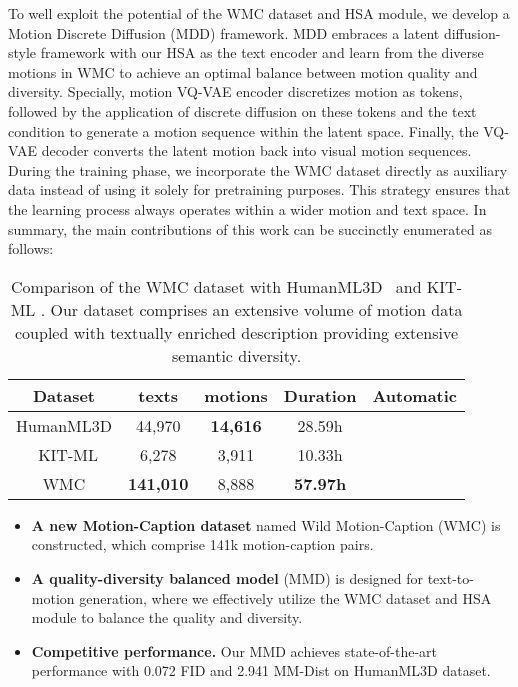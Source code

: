 \documentclass[letterpaper]{article} \usepackage{aaai24}
\newcommand{\xmark}{\ding{55}}
\begin{document}
To well exploit the potential of the WMC dataset and HSA module, we develop a Motion Discrete Diffusion (MDD) framework. MDD embraces a latent diffusion-style framework with our HSA as the text encoder and learn from the diverse motions in WMC to achieve an optimal balance between motion quality and diversity. Specially, 
motion VQ-VAE encoder discretizes motion as tokens, followed by the application of discrete diffusion on these tokens and the text condition to generate a motion sequence within the latent space. Finally, the VQ-VAE decoder converts the latent motion back into visual motion sequences. During the training phase, we incorporate the WMC dataset directly as auxiliary data instead of using it solely for pretraining purposes. This strategy ensures that the learning process always operates within a wider motion and text space. In summary, the main contributions of this work can be succinctly enumerated as follows:
\begin{table}[t]
\small
\begin{tabular}{c|c|c|c|c}
\toprule
Dataset   & texts    & motions & Duration & Automatic \\ \midrule
HumanML3D & 44,970   & \textbf{14,616}  & 28.59h   & \xmark             \\ \ 
KIT-ML    & 6,278   & 3,911   & 10.33h   &  \xmark             \\ \midrule
WMC       & \textbf{141,010} & 8,888   & \textbf{57.97h}   &  \checkmark             \\ \bottomrule
\end{tabular}
\caption{Comparison of the WMC dataset with HumanML3D~\cite{guo2022generating} and KIT-ML \cite{Plappert_2016}. Our dataset comprises an extensive volume of motion data coupled with textually enriched description providing extensive semantic diversity.}
\label{wmc}
\end{table}


\begin{itemize}
    \item \textbf{A new Motion-Caption dataset} named Wild Motion-Caption (WMC) is constructed, which comprise 141k motion-caption pairs.

    \item \textbf{A quality-diversity balanced model} (MMD) is designed for text-to-motion generation, where we effectively utilize the WMC dataset and HSA module to balance the quality and diversity. 

    \item \textbf{Competitive performance.} Our MMD achieves state-of-the-art performance with 0.072 FID and 2.941 MM-Dist on HumanML3D \cite{guo2022generating} dataset.
\end{itemize}
\end{document}
